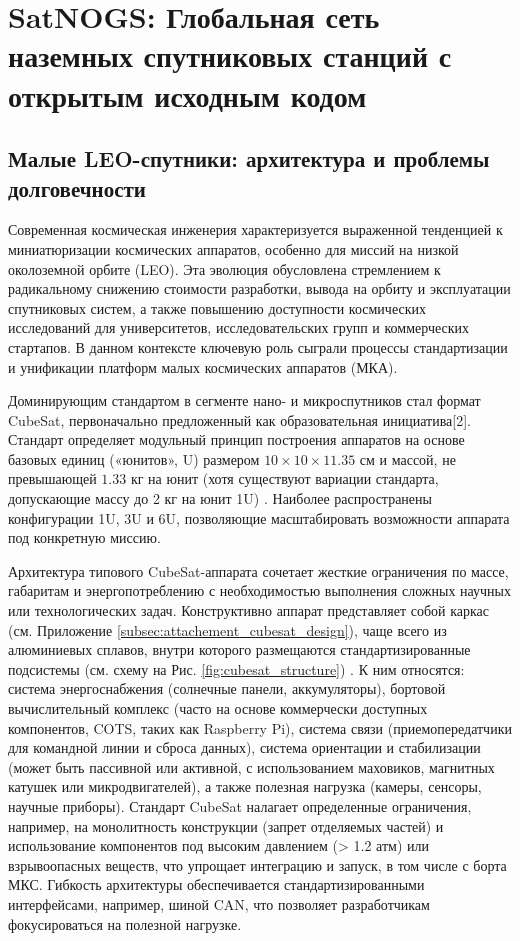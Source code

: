 \chapter{SatNOGS: Глобальная сеть наземных спутниковых станций с открытым исходным кодом}

\section{Малые LEO-спутники: архитектура и проблемы долговечности}

Современная космическая инженерия характеризуется выраженной тенденцией к миниатюризации космических аппаратов, особенно для миссий на низкой околоземной орбите (LEO). Эта эволюция обусловлена стремлением к радикальному снижению стоимости разработки, вывода на орбиту и эксплуатации спутниковых систем, а также повышению доступности космических исследований для университетов, исследовательских групп и коммерческих стартапов. В данном контексте ключевую роль сыграли процессы стандартизации и унификации платформ малых космических аппаратов (МКА).

Доминирующим стандартом в сегменте нано- и микроспутников стал формат CubeSat, первоначально предложенный как образовательная инициатива[2]. Стандарт определяет модульный принцип построения аппаратов на основе базовых единиц («юнитов», U) размером $10 \times 10 \times 11.35$ см и массой, не превышающей $1.33$ кг на юнит (хотя существуют вариации стандарта, допускающие массу до 2 кг на юнит 1U) \cite{cubesat_standard_2014}. Наиболее распространены конфигурации 1U, 3U и 6U, позволяющие масштабировать возможности аппарата под конкретную миссию.

Архитектура типового CubeSat-аппарата сочетает жесткие ограничения по массе, габаритам и энергопотреблению с необходимостью выполнения сложных научных или технологических задач\cite{cubesat_arch_jones_2022, cubesat_low_orbit_nasa_2020}. Конструктивно аппарат представляет собой каркас (см. Приложение \ref{subsec:attachement_cubesat_design}), чаще всего из алюминиевых сплавов, внутри которого размещаются стандартизированные подсистемы (см. схему на Рис. \ref{fig:cubesat_structure}) \cite{cubesat_standard_2014, cubesat_trends_lee_2023}. К ним относятся: система энергоснабжения (солнечные панели, аккумуляторы), бортовой вычислительный комплекс (часто на основе коммерчески доступных компонентов, COTS, таких как Raspberry Pi\cite{cubesat_trends_lee_2023}), система связи (приемопередатчики для командной линии и сброса данных), система ориентации и стабилизации (может быть пассивной или активной, с использованием маховиков, магнитных катушек или микродвигателей), а также полезная нагрузка (камеры, сенсоры, научные приборы)\cite{cubesat_standard_2014}. Стандарт CubeSat налагает определенные ограничения, например, на монолитность конструкции (запрет отделяемых частей) и использование компонентов под высоким давлением (> 1.2 атм) или взрывоопасных веществ, что упрощает интеграцию и запуск, в том числе с борта МКС\cite{cubesat_standard_2014}. Гибкость архитектуры обеспечивается стандартизированными интерфейсами, например, шиной CAN\cite{cubesat_trends_lee_2023}, что позволяет разработчикам фокусироваться на полезной нагрузке\cite{cubesat_trends_lee_2023}.

